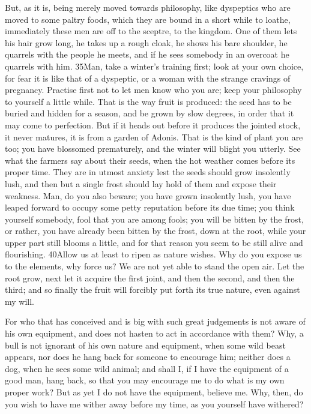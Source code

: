 But, as it is, being merely moved towards philosophy, like dyspeptics who are moved to some paltry foods, which they are bound in a short while to loathe, immediately these men are off to the sceptre, to the kingdom. One of them lets his hair grow long, he takes up a rough cloak, he shows his bare shoulder, he quarrels with the people he meets, and if he sees somebody in an overcoat he quarrels with him. 35Man, take a winter's training first; look at your own choice, for fear it is like that of a dyspeptic, or a woman with the strange cravings of pregnancy. Practise first not to let men know who you are; keep your philosophy to yourself a little while. That is the way fruit is produced: the seed has to be buried and hidden for a season, and be grown by slow degrees, in order that it may come to perfection. But if it heads out before it produces the jointed stock, it never matures, it is from a garden of Adonis. That is the kind of plant you are too; you have blossomed prematurely, and the winter will blight you utterly. See what the farmers say about their seeds, when the hot weather comes before its proper time. They are in utmost anxiety lest the seeds should grow insolently lush, and then but a single frost should lay hold of them and expose their weakness. Man, do you also beware; you have grown insolently lush, you have leaped forward to occupy some petty reputation before its due time; you think yourself somebody, fool that you are among fools; you will be bitten by the frost, or rather, you have already been bitten by the frost, down at the root, while your upper part still blooms a little, and for that reason you seem to be still alive and flourishing. 40Allow us at least to ripen as nature wishes. Why do you expose us to the elements, why force us? We are not yet able to stand the open air. Let the root grow, next let it acquire the first joint, and then the second, and then the third; and so finally the fruit will forcibly put forth its true nature, even against my will.

For who that has conceived and is big with such great judgements is not aware of his own equipment, and does not hasten to act in accordance with them? Why, a bull is not ignorant of his own nature and equipment, when some wild beast appears, nor does he hang back for someone to encourage him; neither does a dog, when he sees some wild animal; and shall I, if I have the equipment of a good man, hang back, so that you may encourage me to do what is my own proper work? But as yet I do not have the equipment, believe me. Why, then, do you wish to have me wither away before my time, as you yourself have withered?


